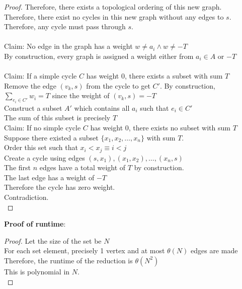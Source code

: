\begin{problem}
\begin{proof}
        Therefore, there exists a topological ordering of this new graph. \\
        Therefore, there exist no cycles in this new graph without any edges to $s$. \\
        Therefore, any cycle must pass through $s$. \\\\
        Claim: No edge in the graph has a weight $w \neq a_i \land w \neq -T$ \\
        By construction, every graph is assigned a weight either from $a_i \in A$ or $-T$ \\\\
        Claim: If a simple cycle $C$ has weight 0, there exists a subset with sum $T$ \\
        Remove the edge $(v_k, s)$ from the cycle to get $C'$. 
        By construction, $\sum_{e_i \in C'}w_i = T$ since the weight of $(v_k, s) = -T$ \\
        Construct a subset $A'$ which contains all $a_i$ such that $e_i \in C'$ \\
        The sum of this subset is precisely $T$ \\
        Claim: If no simple cycle $C$ has weight 0, there exists no subset with sum $T$ \\
        Suppose there existed a subset $\{x_1, x_2, \dots, x_n\}$ with sum $T$. \\
        Order this set such that $x_i < x_j \equiv i < j$ \\
        Create a cycle using edges $(s, x_1), (x_1, x_2), \dots, (x_n, s)$ \\
        The first $n$ edges have a total weight of $T$ by construction. \\
        The last edge has a weight of $-T$ \\
        Therefore the cycle has zero weight. \\
        Contradiction. \\
    \end{proof}
    \noindent
    \textbf{Proof of runtime}:
    \begin{proof}
        Let the size of the set be $N$ \\
        For each set element, precisely 1 vertex and at most $\theta(N)$ edges are made \\
        Therefore, the runtime of the reduction is $\theta(N^2)$ \\
        This is polynomial in $N$. \\
    \end{proof}
\end{problem}
